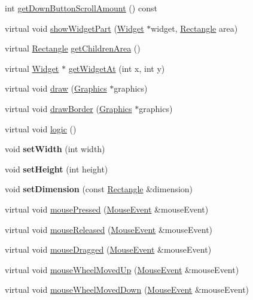 \begin{DoxyCompactItemize}
\item 
int \hyperlink{classgcn_1_1ScrollArea_a0cfd2e66237100b994bbb686ae1d6549}{get\+Down\+Button\+Scroll\+Amount} () const 
\item 
virtual void \hyperlink{classgcn_1_1ScrollArea_a44138b1de2eb2b0b5c6366f573fd15e6}{show\+Widget\+Part} (\hyperlink{classgcn_1_1Widget}{Widget} $\ast$widget, \hyperlink{classgcn_1_1Rectangle}{Rectangle} area)
\item 
virtual \hyperlink{classgcn_1_1Rectangle}{Rectangle} \hyperlink{classgcn_1_1ScrollArea_a49333d5c588cf68aabe635f1cfd41543}{get\+Children\+Area} ()
\item 
virtual \hyperlink{classgcn_1_1Widget}{Widget} $\ast$ \hyperlink{classgcn_1_1ScrollArea_afe0b59bef65e046032550dc76b5ba949}{get\+Widget\+At} (int x, int y)
\item 
virtual void \hyperlink{classgcn_1_1ScrollArea_a2bab40dcb6d851aec51104efb934744c}{draw} (\hyperlink{classgcn_1_1Graphics}{Graphics} $\ast$graphics)
\item 
virtual void \hyperlink{classgcn_1_1ScrollArea_afdad205c6472bb19b6e74dbed2c1d62c}{draw\+Border} (\hyperlink{classgcn_1_1Graphics}{Graphics} $\ast$graphics)
\item 
virtual void \hyperlink{classgcn_1_1ScrollArea_a7e9085abfccf6ebed42484226b4b2aeb}{logic} ()
\item 
void {\bfseries set\+Width} (int width)\hypertarget{classgcn_1_1ScrollArea_a14c20ca903de8744fae96622f6b7b32c}{}\label{classgcn_1_1ScrollArea_a14c20ca903de8744fae96622f6b7b32c}

\item 
void {\bfseries set\+Height} (int height)\hypertarget{classgcn_1_1ScrollArea_a1d8f94104f084f725501245f870c1b0b}{}\label{classgcn_1_1ScrollArea_a1d8f94104f084f725501245f870c1b0b}

\item 
void {\bfseries set\+Dimension} (const \hyperlink{classgcn_1_1Rectangle}{Rectangle} \&dimension)\hypertarget{classgcn_1_1ScrollArea_adf253523beffc7f131c15b9e352d4782}{}\label{classgcn_1_1ScrollArea_adf253523beffc7f131c15b9e352d4782}

\item 
virtual void \hyperlink{classgcn_1_1ScrollArea_a0ba5dd1bed809b0750466ee42a58415d}{mouse\+Pressed} (\hyperlink{classgcn_1_1MouseEvent}{Mouse\+Event} \&mouse\+Event)
\item 
virtual void \hyperlink{classgcn_1_1ScrollArea_a62ef42b8ddde3f762287ae8a83d3b7a4}{mouse\+Released} (\hyperlink{classgcn_1_1MouseEvent}{Mouse\+Event} \&mouse\+Event)
\item 
virtual void \hyperlink{classgcn_1_1ScrollArea_a634b71266274c75a63f0452e07f64735}{mouse\+Dragged} (\hyperlink{classgcn_1_1MouseEvent}{Mouse\+Event} \&mouse\+Event)
\item 
virtual void \hyperlink{classgcn_1_1ScrollArea_a407c584fb2474352df82e8b356e1cb5c}{mouse\+Wheel\+Moved\+Up} (\hyperlink{classgcn_1_1MouseEvent}{Mouse\+Event} \&mouse\+Event)
\item 
virtual void \hyperlink{classgcn_1_1ScrollArea_a1a236f998d0cc5652d8a573d2e2d36a7}{mouse\+Wheel\+Moved\+Down} (\hyperlink{classgcn_1_1MouseEvent}{Mouse\+Event} \&mouse\+Event)
\end{DoxyCompactItemize}
